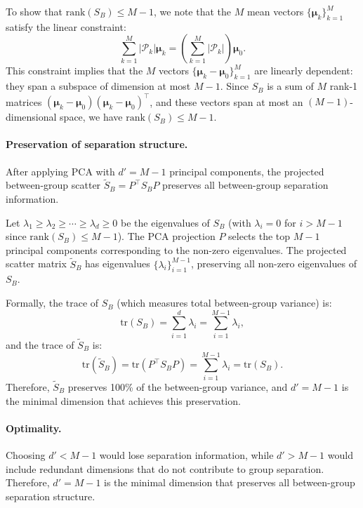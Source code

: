 To show that $\mathrm{rank}(S_B) \leq M-1$, we note that the $M$ mean vectors $\{\boldsymbol{\mu}_k\}_{k=1}^{M}$ satisfy the linear constraint:
\begin{equation}
\sum_{k=1}^{M} |\mathcal{P}_k| \boldsymbol{\mu}_k = \left(\sum_{k=1}^{M} |\mathcal{P}_k|\right) \boldsymbol{\mu}_0.
\end{equation}
This constraint implies that the $M$ vectors $\{\boldsymbol{\mu}_k - \boldsymbol{\mu}_0\}_{k=1}^{M}$ are linearly dependent: they span a subspace of dimension at most $M-1$.
Since $S_B$ is a sum of $M$ rank-1 matrices $(\boldsymbol{\mu}_k - \boldsymbol{\mu}_0)(\boldsymbol{\mu}_k - \boldsymbol{\mu}_0)^\top$, and these vectors span at most an $(M-1)$-dimensional space, we have $\mathrm{rank}(S_B) \leq M-1$.

\paragraph{Preservation of separation structure.}
After applying PCA with $d' = M-1$ principal components, the projected between-group scatter $\tilde{S}_B = P^\top S_B P$ preserves all between-group separation information.

Let $\lambda_1 \geq \lambda_2 \geq \cdots \geq \lambda_d \geq 0$ be the eigenvalues of $S_B$ (with $\lambda_i = 0$ for $i > M-1$ since $\mathrm{rank}(S_B) \leq M-1$).
The PCA projection $P$ selects the top $M-1$ principal components corresponding to the non-zero eigenvalues.
The projected scatter matrix $\tilde{S}_B$ has eigenvalues $\{\lambda_i\}_{i=1}^{M-1}$, preserving all non-zero eigenvalues of $S_B$.

Formally, the trace of $S_B$ (which measures total between-group variance) is:
\begin{equation}
\mathrm{tr}(S_B) = \sum_{i=1}^{d} \lambda_i = \sum_{i=1}^{M-1} \lambda_i,
\end{equation}
and the trace of $\tilde{S}_B$ is:
\begin{equation}
\mathrm{tr}(\tilde{S}_B) = \mathrm{tr}(P^\top S_B P) = \sum_{i=1}^{M-1} \lambda_i = \mathrm{tr}(S_B).
\end{equation}
Therefore, $\tilde{S}_B$ preserves 100\% of the between-group variance, and $d' = M-1$ is the minimal dimension that achieves this preservation.

\paragraph{Optimality.}
Choosing $d' < M-1$ would lose separation information, while $d' > M-1$ would include redundant dimensions that do not contribute to group separation.
Therefore, $d' = M-1$ is the minimal dimension that preserves all between-group separation structure.

